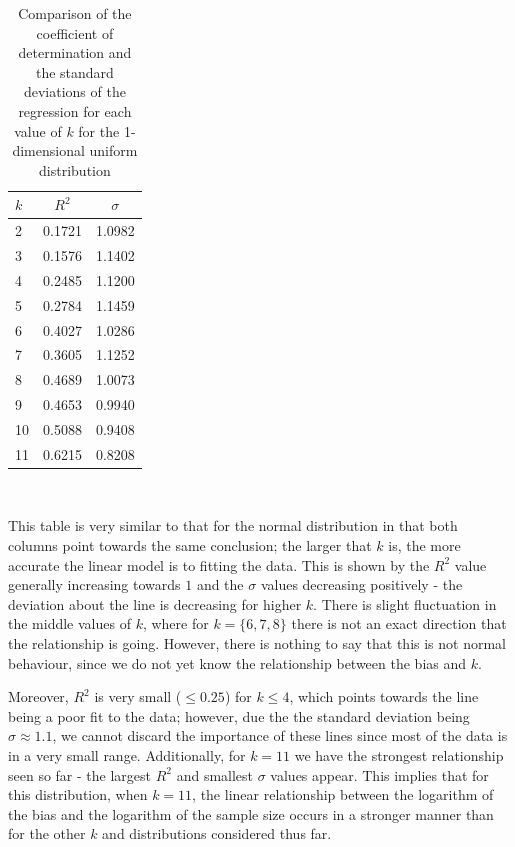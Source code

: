 \documentclass[12pt]{report}
\begin{document}
\begin{table}
\caption{Comparison of the coefficient of determination and the standard deviations of the regression for each value of $k$ for the 1-dimensional uniform distribution} \label{uniform_rsq}
\begin{center}
\begin{tabular}{| l | c c |} 
\toprule
$k$ & $R^2$ & $\sigma$ \\
\midrule[1pt]
2     & 0.1721    & 1.0982   \\
3     & 0.1576    & 1.1402   \\
4     & 0.2485    & 1.1200   \\
5     & 0.2784    & 1.1459   \\
6     & 0.4027    & 1.0286   \\
7     & 0.3605    & 1.1252   \\
8     & 0.4689    & 1.0073   \\
9     & 0.4653    & 0.9940   \\
10    & 0.5088    & 0.9408   \\
11    & 0.6215    & 0.8208   \\
\hline
\end{tabular}
\\[10pt]
\end{center}
\end{table}

This table is very similar to that for the normal distribution in that both columns point towards the same conclusion; the larger that $k$ is, the more accurate the linear model is to fitting the data. This is shown by the $R^2$ value generally increasing towards $1$ and the $\sigma$ values decreasing positively - the deviation about the line is decreasing for higher $k$. There is slight fluctuation in the middle values of $k$, where for $k = \{6, 7, 8\}$ there is not an exact direction that the relationship is going. However, there is nothing to say that this is not normal behaviour, since we do not yet know the relationship between the bias and $k$.

Moreover, $R^2$ is very small ($\leq 0.25$) for $k \leq 4$, which points towards the line being a poor fit to the data; however, due the the standard deviation being $\sigma \approx 1.1$, we cannot discard the importance of these lines since most of the data is in a very small range. Additionally, for $k=11$ we have the strongest relationship seen so far - the largest $R^2$ and smallest $\sigma$ values appear. This implies that for this distribution, when $k=11$, the linear relationship between the logarithm of the bias and the logarithm of the sample size occurs in a stronger manner than for the other $k$ and distributions considered thus far.
\end{document}

